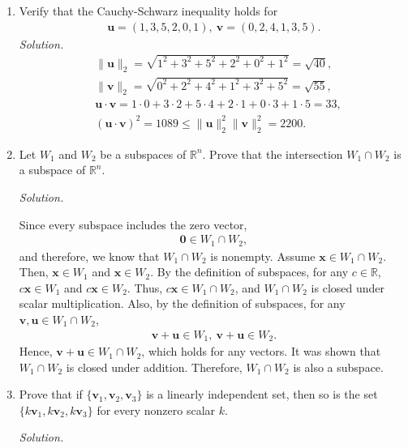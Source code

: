 \documentclass{article}
\begin{document}
\begin{enumerate}
\item Verify that the Cauchy-Schwarz inequality holds for 
	\begin{align*}
	\mathbf{u}=(1,3,5,2,0,1),~\mathbf{v}=(0,2,4,1,3,5).	
	\end{align*}
\emph{Solution.}\\
	\begin{align*}
	&\|\mathbf{u}\|_2=\sqrt{1^2+3^2+5^2+2^2+0^2+1^2}=\sqrt{40},\\
	&\|\mathbf{v}\|_2=\sqrt{0^2+2^2+4^2+1^2+3^2+5^2}=\sqrt{55},\\
	&\mathbf{u}\cdot\mathbf{v}=1\cdot0+3\cdot2+5\cdot4+2\cdot1+0\cdot3+1\cdot5=33,\\
	&(\mathbf{u}\cdot\mathbf{v})^2=1089\leq 	\|\mathbf{u}\|_2^2\|\mathbf{v}\|_2^2=2200.
	\end{align*}


\item Let $W_1$ and $W_2$ be a subspaces of $\mathbb{R}^n$. Prove that the intersection $W_1\cap W_2$ is a subspace of $\mathbb{R}^n$.

\emph{Solution.}

Since every subspace includes the zero vector, 
	\begin{align*}
	\mathbf{0}\in W_1\cap W_2,	
	\end{align*}
and therefore, we know that $W_1\cap W_2$ is nonempty.
Assume $\mathbf{x}\in W_1\cap W_2$. Then, $\mathbf{x}\in W_1$ and $\mathbf{x}\in W_2$. 
By the definition of subspaces, for any $c\in\mathbb{R}$, $c\mathbf{x}\in W_1$ and $c\mathbf{x}\in W_2$. Thus, $c\mathbf{x}\in W_1\cap W_2$, and $W_1\cap W_2$ is closed under scalar multiplication.
Also, by the definition of subspaces, for any $\mathbf{v},\mathbf{u}\in W_1\cap W_2$, 
	\begin{align*}
	\mathbf{v}+\mathbf{u}\in W_1,~\mathbf{v}+\mathbf{u}\in W_2.	
	\end{align*}
Hence, $\mathbf{v}+\mathbf{u}\in W_1\cap W_2$, which holds for any vectors. 
It was shown that $W_1\cap W_2$ is closed under addition.
Therefore, $W_1\cap W_2$ is also a subspace.

\item Prove that if $\{\mathbf{v}_1,\mathbf{v}_2,\mathbf{v}_3\}$ is a linearly independent set, then so is the set $\{k\mathbf{v}_1,k\mathbf{v}_2,k\mathbf{v}_3\}$ for every nonzero scalar $k$.

\emph{Solution.}


\end{enumerate}
\end{document}
